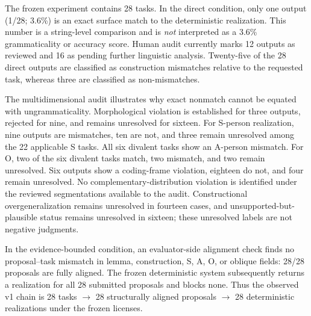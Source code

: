 \documentclass[11pt]{article}
\begin{document}
The frozen experiment contains 28 tasks. In the direct condition, only one
output (1/28; 3.6\%) is an exact surface match to the deterministic realization.
This number is a string-level comparison and is \emph{not} interpreted as a
3.6\% grammaticality or accuracy score. Human audit currently marks 12 outputs
as reviewed and 16 as pending further linguistic analysis. Twenty-five of the
28 direct outputs are classified as construction mismatches relative to the
requested task, whereas three are classified as non-mismatches.

The multidimensional audit illustrates why exact nonmatch cannot be equated
with ungrammaticality. Morphological violation is established for three outputs,
rejected for nine, and remains unresolved for sixteen. For S-person realization,
nine outputs are mismatches, ten are not, and three remain unresolved among the
22 applicable S tasks. All six divalent tasks show an A-person mismatch. For O,
two of the six divalent tasks match, two mismatch, and two remain unresolved.
Six outputs show a coding-frame violation, eighteen do not, and four remain
unresolved. No complementary-distribution violation is identified under the reviewed
segmentations available to the audit. Constructional overgeneralization remains
unresolved in fourteen cases, and unsupported-but-plausible status remains
unresolved in sixteen; these unresolved labels are not negative judgments.

In the evidence-bounded condition, an evaluator-side alignment check finds no
proposal--task mismatch in lemma, construction, S, A, O, or oblique fields:
28/28 proposals are fully aligned. The frozen deterministic system subsequently
returns a realization for all 28 submitted proposals and blocks none. Thus the
observed v1 chain is 28 tasks $\rightarrow$ 28 structurally aligned proposals
$\rightarrow$ 28 deterministic realizations under the frozen licenses.
\end{document}

